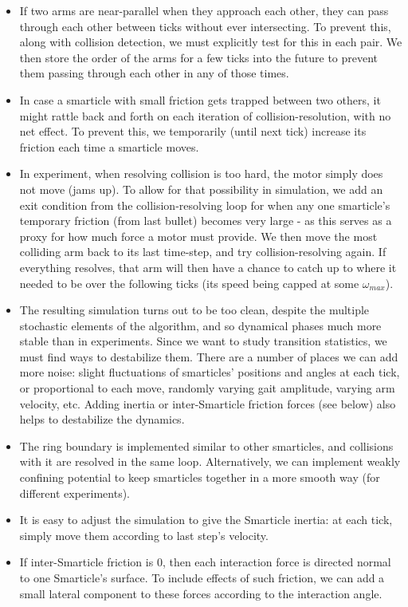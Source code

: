 \documentclass[reprint,prx]{revtex4-1}
\renewcommand{\=}[1]{\stackrel{#1}{=}} %
\renewcommand{\(}{\left (}
\renewcommand{\)}{\right  )}
\renewcommand{\[}{\left [}
\renewcommand{\]}{\right ]}
\newcommand{\<}{\left <}
\renewcommand{\>}{\right >}
\theoremstyle{definition}
\theoremstyle{remark}
\begin{document}
\begin{itemize}
	\item  If two arms are near-parallel when they approach each other, they can pass through each other between ticks without ever intersecting. To prevent this, along with collision detection, we must explicitly test for this in each pair. We then store the order of the arms for a few ticks into the future to prevent them passing through each other in any of those times.
	\item In case a smarticle with small friction gets trapped between two others, it might rattle back and forth on each iteration of collision-resolution, with no net effect. To prevent this, we temporarily (until next tick) increase its friction each time a smarticle moves.
	\item In experiment, when resolving collision is too hard, the motor simply does not move (jams up). To allow for that possibility in simulation, we add an exit condition from the collision-resolving loop for when any one smarticle's temporary friction (from last bullet) becomes very large - as this serves as a proxy for how much force a motor must provide. We then move the most colliding arm back to its last time-step, and try collision-resolving again. If everything resolves, that arm will then have a chance to catch up to where it needed to be over the following ticks (its speed being capped at some $ \omega_{max} $).
	\item The resulting simulation turns out to be too clean, despite the multiple stochastic elements of the algorithm, and so dynamical phases much more stable than in experiments. Since we want to study transition statistics, we must find ways to destabilize them. There are a number of places we can add more noise: slight fluctuations of smarticles' positions and angles at each tick, or proportional to each move, randomly varying gait amplitude, varying arm velocity, etc. Adding inertia or inter-Smarticle friction forces (see below) also helps to destabilize the dynamics.
	\item The ring boundary is implemented similar to other smarticles, and collisions with it are resolved in the same loop. Alternatively, we can implement weakly confining potential to keep smarticles together in a more smooth way (for different experiments).
	\item It is easy to adjust the simulation to give the Smarticle inertia: at each tick, simply move them according to last step's velocity. 
	\item  If inter-Smarticle friction is 0, then each interaction force is directed normal to one Smarticle's surface. To include effects of such friction, we can add a small lateral component to these forces according to the interaction angle.  
\end{itemize}
\end{document}

